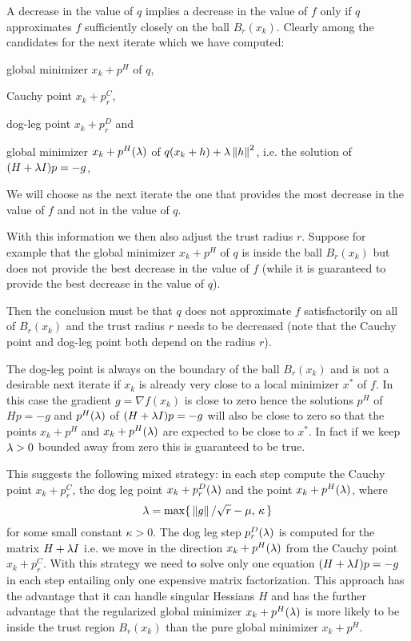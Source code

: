 A decrease in the value of $q$ implies a decrease in the value of $f$ only if $q$ approximates 
$f$ sufficiently closely on the ball $B_r(x_k)$. Clearly among the candidates for the next iterate
which we have computed:
%
\begin{packed_enum}
\item global minimizer $x_k+p^H$ of $q$,
\item Cauchy point $x_k+p^C_r$,
\item dog-leg point $x_k+p^D_r$ and
\item global minimizer $x_k+p^H(\lambda)$ of $q(x_k+h)+\lambda\left\|h\right\|^2$, i.e. the solution of\\ $(H+\lambda I)p=-g$, 
\end{packed_enum}
%
We will choose as the next iterate the one 
that provides the most decrease in the value of $f$ and not in the value of $q$.

With this information we then also adjust the trust radius $r$. Suppose for example that the   
global minimizer $x_k+p^H$ of $q$ is inside the ball $B_r(x_k)$ but does not provide the best decrease   
in the value of $f$ (while it is guaranteed to provide the best decrease in the value of $q$).

Then the conclusion must be that $q$ does not approximate $f$ satisfactorily on all of $B_r(x_k)$  
and the trust radius $r$ needs to be decreased (note that the Cauchy point and dog-leg point both
depend on the radius $r$).

The dog-leg point is always on the boundary of the ball $B_r(x_k)$ and is not a desirable next iterate   
if $x_k$ is already very close to a local minimizer $x^*$ of $f$. In this case the gradient $g=\nabla f(x_k)$    
is close to zero hence the solutions $p^H$ of $Hp=-g$ and $p^H(\lambda)$ of $(H+\lambda I)p=-g$ will also be close to  
zero so that the points $x_k+p^H$ and $x_k+p^H(\lambda)$ are expected to be close to $x^*$. In fact if we keep
$\lambda>0$ bounded away from zero this is guaranteed to be true.

This suggests the following mixed strategy: in each step compute the Cauchy point $x_k+p^C_r$, the dog leg point
$x_k+p^D_r(\lambda)$ and the point $x_k+p^H(\lambda)$, where 
$$
\lambda = \max\{\thinspace\left\|g\right\|/\sqrt r-\mu,\thinspace\kappa\thinspace\}
$$
for some small constant $\kappa>0$. The dog leg step $p^D_r(\lambda)$ is computed for the matrix $H+\lambda I$ i.e. we move 
in the direction $x_k+p^H(\lambda)$ from the Cauchy point $x_k+p^C_r$. With this strategy we need to solve only one
equation $(H+\lambda I)p=-g$ in each step entailing only one expensive matrix factorization.
This approach has the advantage that it can handle singular Hessians $H$ and has the further advantage that the 
regularized global minimizer $x_k+p^H(\lambda)$ is more likely to be inside the trust region $B_r(x_k)$ than the pure   
global minimizer $x_k+p^H$.


